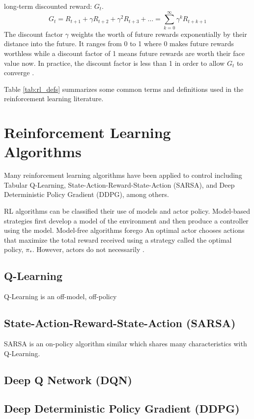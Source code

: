 long-term discounted reward: $G_t$.
\begin{equation}
	G_t=R_{t+1}+\gamma R_{t+2}+\gamma^2 R_{t+3} + \dots = \sum_{k=0}^{\infty} \gamma^k R_{t+k+1}
\end{equation}
The discount factor $\gamma$ weights the worth of future rewards exponentially by their distance into the future. It ranges from 0 to 1 where 0 makes future rewards worthless while a discount factor of 1 means future rewards are worth their face value now. In practice, the discount factor is less than 1 in order to allow $G_t$ to converge \cite{sutton_2017}.

Table \ref{tab:rl_defs} summarizes some common terms and definitions used in the reinforcement learning literature.


\section{Reinforcement Learning Algorithms}
Many reinforcement learning algorithms have been applied to control including Tabular Q-Learning, State-Action-Reward-State-Action (SARSA), and Deep Deterministic Policy Gradient (DDPG), among others.

RL algorithms can be classified their use of models and actor policy. Model-based strategies first develop a model of the environment and then produce a controller using the model. Model-free algorithms forego An optimal actor chooses actions that maximize the total reward received using a strategy called the optimal policy, $\pi_*$. However, actors do not necessarily .

\subsection{Q-Learning}
Q-Learning is an off-model, off-policy 

\subsection{State-Action-Reward-State-Action (SARSA)}
SARSA is an on-policy algorithm similar which shares many characteristics with Q-Learning.

\subsection{Deep Q Network (DQN)}


\subsection{Deep Deterministic Policy Gradient (DDPG)}





